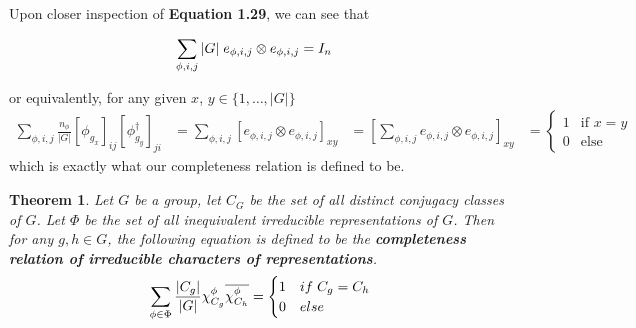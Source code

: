 \documentclass[10pt]{ucthesis}
\newtheorem{theorem}[definition]{Theorem}
\begin{document}
Upon closer inspection of \textbf{Equation 1.29}, we can see that 

\begin{equation}
	\begin{aligned}
		\sum_{\phi,i,j} {|G|} \hspace{1mm}e_{\phi,i,j} \otimes e_{\phi,i,j} &= I_n
	\end{aligned}
\end{equation}

or equivalently, for any given $x$, $y \in \{1,\hdots,|G|\}$ 
\begin{equation}
	\begin{aligned}
		\sum_{\phi,i,j} \frac{n_\phi}{|G|} [\phi_{g_x}]_{ij}[\phi^\dag_{g_y}]_{ji} &= \sum_{\phi,i,j} \left[e_{\phi,i,j} \otimes e_{\phi,i,j}\right]_{xy} &= \left[\sum_{\phi,i,j} e_{\phi,i,j} \otimes e_{\phi,i,j}\right]_{xy} &= \begin{cases}
																	1 & \text{if } x=y\\
																	0 & \text{else}
																\end{cases}
	\end{aligned}
\end{equation}
which is exactly what our completeness relation is defined to be. \qedsymbol \\







\begin{theorem}
Let $G$ be a group, let $C_G$ be the set of all distinct conjugacy classes of $G$. Let $\Phi$ be the set of all inequivalent irreducible representations of $G$. Then for any $g,h \in G$, the following equation is defined to be the \textbf{completeness relation of irreducible characters of representations}.
$$\sum_{\phi \in \Phi} \frac{|C_g|}{|G|} \chi^{\phi}_{C_g} \overline{\chi^{\phi}_{C_h}} = \begin{cases}
																1 & if \hspace{1mm} C_g = C_h \\
																0 & else
															\end{cases}$$
\end{theorem}
\end{document}
